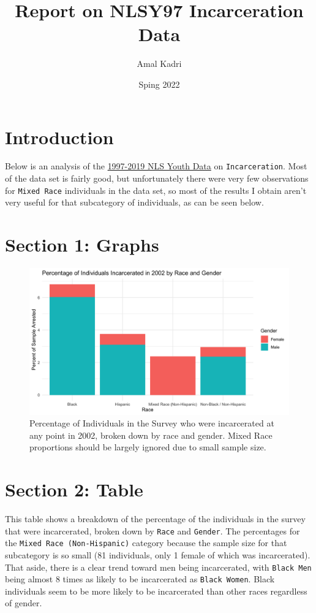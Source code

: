 \documentclass{article}
\author{Amal Kadri}
\title{Report on NLSY97 Incarceration Data}
\date{Sping 2022}
\begin{document}
\maketitle
\section{Introduction}
Below is an analysis of the \href{https://www.nlsinfo.org/investigator/pages/search}{1997-2019 NLS Youth Data} on \texttt{Incarceration}. Most of the data set is fairly good, but unfortunately there were very few observations for \texttt{Mixed Race} individuals in the data set, so most of the results I obtain aren't very useful for that subcategory of individuals, as can be seen below.

\section{Section 1: Graphs}

\begin{figure}[H]
    \begin{center}
        \includegraphics[width=.85\textwidth]{incarceration_by_racegender.png}
    \end{center}
    \caption{Percentage of Individuals in the Survey who were incarcerated at any point in 2002, broken down by race and gender. Mixed Race proportions should be largely ignored due to small sample size.}
    \label{fig:graph}
\end{figure}

\newpage
\section{Section 2: Table}

  
This table shows a breakdown of the percentage of the individuals in the survey that were incarcerated, broken down by \texttt{Race} and \texttt{Gender}. The percentages for the \texttt{Mixed Race (Non-Hispanic)} category because the sample size for that subcategory is so small (81 individuals, only 1 female of which was incarcerated). That aside, there is a clear trend toward men being incarcerated, with \texttt{Black Men} being almost 8 times as likely to be incarcerated as \texttt{Black Women}. Black individuals seem to be more likely to be incarcerated than other races regardless of gender.
\end{document}
